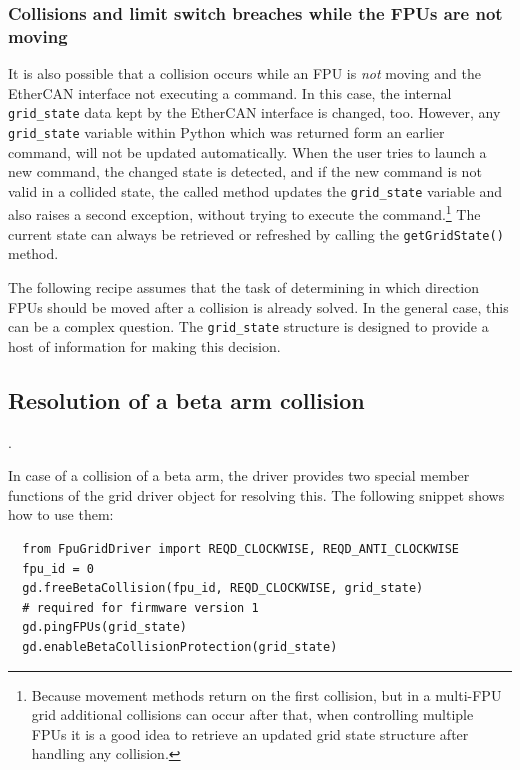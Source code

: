 \documentclass[11pt,a4paper]{scrartcl}
\begin{document}
\subsubsection{Collisions and limit switch breaches while the FPUs are not moving}
 It is also possible that
a collision occurs while an FPU is \emph{not} moving and the EtherCAN interface
not executing a command.  In this case, the internal
\texttt{grid\_state} data kept by the EtherCAN interface is changed, too. However,
any \texttt{grid\_state} variable within Python which was returned
form an earlier command, will not be updated automatically. When the
user tries to launch a new command, the changed state is detected, and
if the new command is not valid in a collided state, the called method
updates the \texttt{grid\_state} variable and also raises a second
exception, without trying to execute the command.\footnote{Because
  movement methods return on the first collision, but in a multi-FPU
  grid additional collisions can occur after that, when controlling
  multiple FPUs it is a good idea to retrieve an updated grid state
  structure after handling any collision.}  The current state can
always be retrieved or refreshed by calling the
\texttt{getGridState()} method.

The following recipe assumes that the task of determining in which
direction FPUs should be moved after a collision is already solved.
In the general case, this can be a complex question. The
\texttt{grid\_state} structure is designed to provide a host of
information for making this decision.

\subsection{Resolution of a beta arm collision}
\label{sec:betacollisionresolution}.

In case of a collision of a beta arm, the driver provides two special
member functions of the grid driver object for resolving this. The
following snippet shows how to use them:

\begin{verbatim}
  from FpuGridDriver import REQD_CLOCKWISE, REQD_ANTI_CLOCKWISE
  fpu_id = 0
  gd.freeBetaCollision(fpu_id, REQD_CLOCKWISE, grid_state)
  # required for firmware version 1
  gd.pingFPUs(grid_state)
  gd.enableBetaCollisionProtection(grid_state)
\end{verbatim}
\end{document}

